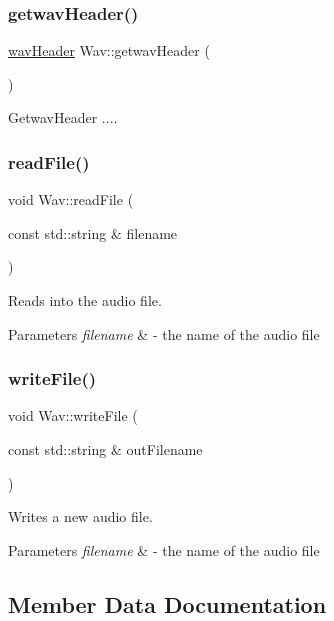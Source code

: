\subsubsection{\texorpdfstring{getwav\+Header()}{getwavHeader()}}
{\footnotesize\ttfamily \hyperlink{structwavHeader}{wav\+Header} Wav\+::getwav\+Header (\begin{DoxyParamCaption}{ }\end{DoxyParamCaption})}

Getwav\+Header .... \mbox{\label{classWav_a8dbfa6c6dc4d8a0df92b0e4cb49d0133}} 
\subsubsection{\texorpdfstring{read\+File()}{readFile()}}
{\footnotesize\ttfamily void Wav\+::read\+File (\begin{DoxyParamCaption}\item[{const std\+::string \&}]{filename }\end{DoxyParamCaption})}

Reads into the audio file. 
\begin{DoxyParams}{Parameters}
{\em filename} & -\/ the name of the audio file \\
\hline
\end{DoxyParams}
\mbox{\label{classWav_a3e4d48579d4c83afb0519ac8492af6d0}} 
\subsubsection{\texorpdfstring{write\+File()}{writeFile()}}
{\footnotesize\ttfamily void Wav\+::write\+File (\begin{DoxyParamCaption}\item[{const std\+::string \&}]{out\+Filename }\end{DoxyParamCaption})}

Writes a new audio file. 
\begin{DoxyParams}{Parameters}
{\em filename} & -\/ the name of the audio file \\
\hline
\end{DoxyParams}


\subsection{Member Data Documentation}
\mbox{\label{classWav_ae1ba9e10151e9d104c150f6cc5512199}} 
